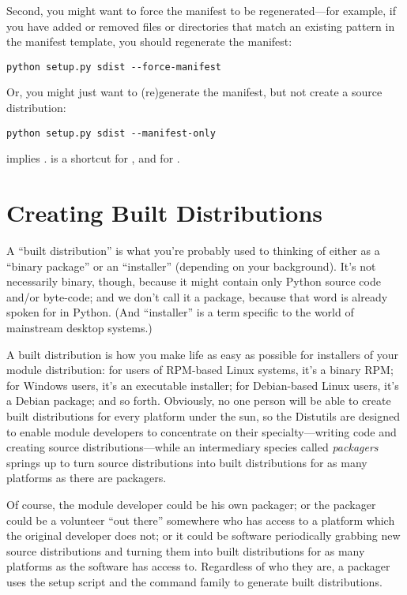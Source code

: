 \documentclass{manual}
\begin{document}
Second, you might want to force the manifest to be regenerated---for
example, if you have added or removed files or directories that match an
existing pattern in the manifest template, you should regenerate the
manifest:

\begin{verbatim}
python setup.py sdist --force-manifest
\end{verbatim}

Or, you might just want to (re)generate the manifest, but not create a
source distribution:

\begin{verbatim}
python setup.py sdist --manifest-only
\end{verbatim}

 implies .
 is a shortcut for , and
 for .


\chapter{Creating Built Distributions}
\label{built-dist}

A ``built distribution'' is what you're probably used to thinking of
either as a ``binary package'' or an ``installer'' (depending on your
background).  It's not necessarily binary, though, because it might
contain only Python source code and/or byte-code; and we don't call it a
package, because that word is already spoken for in Python.  (And
``installer'' is a term specific to the world of mainstream desktop
systems.)

A built distribution is how you make life as easy as possible for
installers of your module distribution: for users of RPM-based Linux
systems, it's a binary RPM; for Windows users, it's an executable
installer; for Debian-based Linux users, it's a Debian package; and so
forth.  Obviously, no one person will be able to create built
distributions for every platform under the sun, so the Distutils are
designed to enable module developers to concentrate on their
specialty---writing code and creating source distributions---while an
intermediary species called \emph{packagers} springs up to turn source
distributions into built distributions for as many platforms as there
are packagers.

Of course, the module developer could be his own packager; or the
packager could be a volunteer ``out there'' somewhere who has access to
a platform which the original developer does not; or it could be
software periodically grabbing new source distributions and turning them
into built distributions for as many platforms as the software has
access to.  Regardless of who they are, a packager uses the
setup script and the  command family to generate built
distributions.
\end{document}
